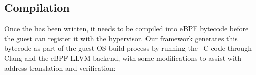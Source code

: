 \documentclass[11pt]{article}
\begin{document}
%
%


\subsection{Compilation}
\label{sec:compilation}

Once the \hypercallback{} has been written, it needs to be compiled into
eBPF bytecode before the guest can register it with the hypervisor. Our
framework generates this bytecode as part of the guest OS build process by
running the \hypercallback~C code through Clang and the eBPF LLVM backend,
with some modifications to assist with address translation and verification:



\end{document}
